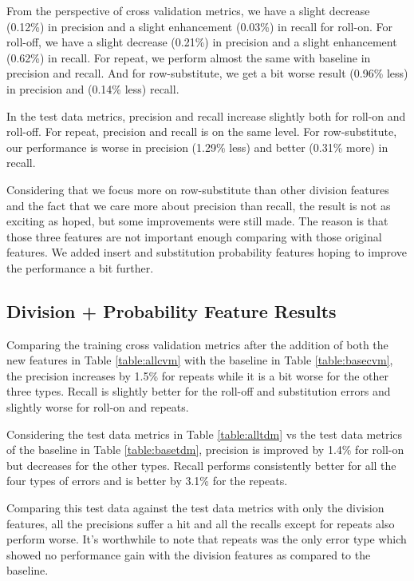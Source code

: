 \documentclass[letterpaper, 10 pt, conference]{ieeeconf}  %
\begin{document}
From the perspective of cross validation metrics, we have a slight decrease (0.12\%) in precision and a slight enhancement (0.03\%) in recall for roll-on. For roll-off,  we have a slight decrease (0.21\%) in precision and a slight enhancement (0.62\%) in recall. For repeat, we perform almost the same with baseline in precision and recall. And for row-substitute, we get a bit worse result (0.96\% less) in precision and (0.14\% less) recall. 

In the test data metrics, precision and recall increase slightly both for roll-on and roll-off. For repeat, precision and recall is on the same level. For row-substitute, our performance is worse in precision (1.29\% less) and better (0.31\% more) in recall.

Considering that we focus more on row-substitute than other division features and the fact that we care more about precision than recall, the result is not as exciting as hoped, but some improvements were still made. The reason is that those three features are not important enough comparing with those original features. We added insert and substitution probability features hoping to improve the performance a bit further. 

\subsection{Division + Probability Feature Results}
Comparing the training cross validation metrics after the addition of both the new features in Table \ref{table:allcvm} with the baseline in Table \ref{table:basecvm}, the precision increases by 1.5\% for repeats while it is a bit worse for the other three types. Recall is slightly better for the roll-off and substitution errors and slightly worse for roll-on and repeats.

Considering the test data metrics in Table \ref{table:alltdm} vs the test data metrics of the baseline in Table \ref{table:basetdm}, precision is improved by 1.4\% for roll-on but decreases for the other types. Recall performs consistently better for all the four types of errors and is better by 3.1\% for the repeats.

Comparing this test data against the test data metrics with only the division features, all the precisions suffer a hit and all the recalls except for repeats also perform worse. It's worthwhile to note that repeats was the only error type which showed no performance gain with the division features as compared to the baseline.
\end{document}
